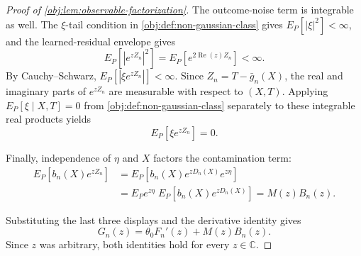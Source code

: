\begin{proof}[Proof of \cref{obj:lem:observable-factorization}]
The outcome-noise term is integrable as well.  The \(\xi\)-tail condition in \cref{obj:def:non-gaussian-class} gives \(E_P[|\xi|^2]<\infty\), and the learned-residual envelope gives
\[
E_P\!\left[\left|e^{zZ_n}\right|^2\right]
=E_P\!\left[e^{2\operatorname{Re}(z)Z_n}\right]<\infty.
\]
By Cauchy--Schwarz, \(E_P[|\xi e^{zZ_n}|]<\infty\). %
Since \(Z_n=T-\bar g_n(X)\), the real and imaginary parts of \(e^{zZ_n}\) are measurable with respect to \((X,T)\).  Applying \(E_P[\xi\mid X,T]=0\) from \cref{obj:def:non-gaussian-class} separately to these integrable real products yields
\[
E_P\!\left[\xi e^{zZ_n}\right]=0.
\]

Finally, independence of \(\eta\) and \(X\) factors the contamination term:
\[
\begin{aligned}
E_P\!\left[b_n(X)e^{zZ_n}\right]
&=E_P\!\left[b_n(X)e^{zD_n(X)}e^{z\eta}\right] \\
&=E_Pe^{z\eta}\;E_P\!\left[b_n(X)e^{zD_n(X)}\right]
=M(z)B_n(z).
\end{aligned}
\]

Substituting the last three displays and the derivative identity gives
\[
G_n(z)=\theta_0F_n'(z)+M(z)B_n(z).
\]
Since \(z\) was arbitrary, both identities hold for every \(z\in\mathbb C\). %
\end{proof}
